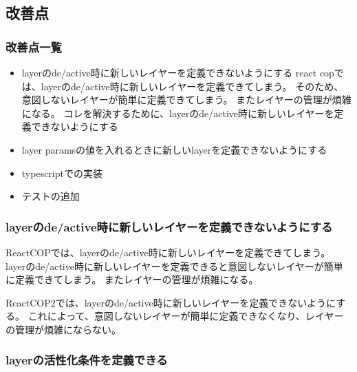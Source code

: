 \documentclass{jsarticle}
\begin{document}
\subsection{改善点}


\subsubsection{改善点一覧}

\begin{itemize}
	\item layerのde/active時に新しいレイヤーを定義できないようにする
	      react copでは、layerのde/active時に新しいレイヤーを定義できてしまう。
	      そのため、意図しないレイヤーが簡単に定義できてしまう。
	      またレイヤーの管理が煩雑になる。
	      コレを解決するために、layerのde/active時に新しいレイヤーを定義できないようにする
	\item layer paramsの値を入れるときに新しいlayerを定義できないようにする
	\item typescriptでの実装
	\item テストの追加
\end{itemize}


\subsubsection{layerのde/active時に新しいレイヤーを定義できないようにする}
ReactCOPでは、layerのde/active時に新しいレイヤーを定義できてしまう。
layerのde/active時に新しいレイヤーを定義できると意図しないレイヤーが簡単に定義できてしまう。
またレイヤーの管理が煩雑になる。

ReactCOP2では、layerのde/active時に新しいレイヤーを定義できないようにする。
これによって、意図しないレイヤーが簡単に定義できなくなり、レイヤーの管理が煩雑にならない。


\subsubsection{layerの活性化条件を定義できる}

\end{document}
